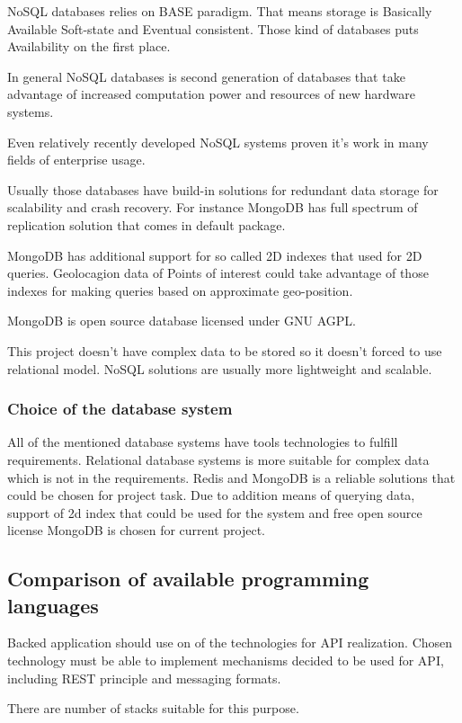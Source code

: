 \documentclass[thesis=M,english]{FITthesis}[2012/10/20]
\begin{document}
NoSQL databases relies on BASE paradigm. That means storage is Basically Available Soft-state and Eventual consistent. Those kind of databases puts Availability on the first place.

In general NoSQL databases is second generation of databases that take advantage of increased computation power and resources of new hardware systems.

Even relatively recently developed NoSQL systems proven it's work in many fields of enterprise usage.

Usually those databases have build-in solutions for redundant data storage for scalability and crash recovery. For instance MongoDB has full spectrum of replication solution that comes in default package.

MongoDB has additional support for so called 2D indexes that used for 2D queries. Geolocagion data of Points of interest could take advantage of those indexes for making queries based on approximate geo-position.

MongoDB is open source database licensed under GNU AGPL.

This project doesn't have complex data to be stored so it doesn't forced to use relational model. NoSQL solutions are usually more lightweight and scalable.

\subsubsection{Choice of the database system}

All of the mentioned database systems have tools technologies to fulfill requirements. Relational database systems is more suitable for complex data which is not in the requirements. Redis and MongoDB is a reliable solutions that could be chosen for project task. Due to addition means of querying data, support of 2d index that could be used for the system and free open source license MongoDB is chosen for current project.

\subsection{Comparison of available programming languages}

Backed application should use on of the technologies for API realization. Chosen technology must be able to implement mechanisms decided to be used for API, including REST principle and messaging formats.

There are number of stacks suitable for this purpose.
\end{document}
